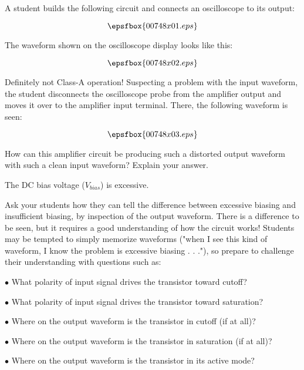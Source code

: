 

A student builds the following circuit and connects an oscilloscope to its output:

$$\epsfbox{00748x01.eps}$$

The waveform shown on the oscilloscope display looks like this:

$$\epsfbox{00748x02.eps}$$

Definitely not Class-A operation!  Suspecting a problem with the input waveform, the student disconnects the oscilloscope probe from the amplifier output and moves it over to the amplifier input terminal.  There, the following waveform is seen:

$$\epsfbox{00748x03.eps}$$

How can this amplifier circuit be producing such a distorted output waveform with such a clean input waveform?  Explain your answer.







The DC bias voltage ($V_{bias}$) is excessive.







Ask your students how they can tell the difference between excessive biasing and insufficient biasing, by inspection of the output waveform.  There is a difference to be seen, but it requires a good understanding of how the circuit works!  Students may be tempted to simply memorize waveforms ("when I see this kind of waveform, I know the problem is excessive biasing . . ."), so prepare to challenge their understanding with questions such as:

\medskip
\item{$\bullet$} What polarity of input signal drives the transistor toward cutoff?
\item{$\bullet$} What polarity of input signal drives the transistor toward saturation?
\item{$\bullet$} Where on the output waveform is the transistor in cutoff (if at all)?
\item{$\bullet$} Where on the output waveform is the transistor in saturation (if at all)?
\item{$\bullet$} Where on the output waveform is the transistor in its active mode?
\medskip

